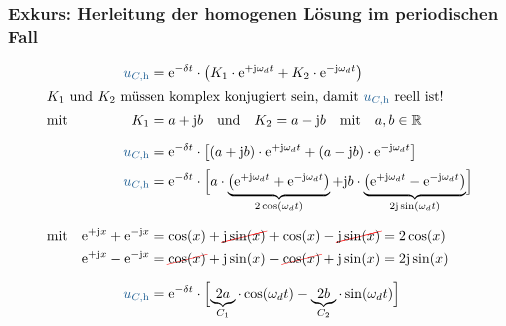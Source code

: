 
\newpage%
\subsubsection{Exkurs: Herleitung der homogenen Lösung im periodischen Fall}
\label{sec:schaltvorgaengezeitbereich:rlc:herleitung}
%
\begin{frame}[t]\ftx{\subsubsecname}
\ifvmode\vspace*{-\baselineskip}\setlength{\parskip}{0ex}\fi%
\begin{align}
    &&
        \ecv{u_{C,\mathrm{h}}} &= \mathrm{e}^{-\delta t} \cdot \left( K_1 \cdot \mathrm{e}^{+\mathrm{j}\omega_d t} + K_2 \cdot \mathrm{e}^{-\mathrm{j}\omega_d t} \right) \nonumber\\
\intertext{$K_1$ und $K_2$ müssen komplex konjugiert sein, damit $\ecv{u_{C,\mathrm{h}}}$ reell ist!}
&\text{mit}&
        K_1 &= a + \mathrm{j} b \mathrlap{\quad\text{und}\quad K_2 = a - \mathrm{j} b\quad\text{mit}\quad a,b \in \mathbb{R}} \nonumber\\[6pt]
    &&
        \ecv{u_{C,\mathrm{h}}} &= \mathrm{e}^{-\delta t} \cdot \left[ (a + \mathrm{j} b) \cdot \mathrm{e}^{+\mathrm{j}\omega_d t} + (a - \mathrm{j} b) \cdot \mathrm{e}^{-\mathrm{j}\omega_d t} \right] \nonumber\\[2pt]
    &&
        \ecv{u_{C,\mathrm{h}}} &= \mathrm{e}^{-\delta t} \cdot
            \left[\vphantom{\Big|}
            \smash{ a \cdot
            \underbrace{\left(
                \mathrm{e}^{+\mathrm{j}\omega_d t} + \mathrm{e}^{-\mathrm{j}\omega_d t}
            \right)}_{2\cos(\omega_d t)}
            + \mathrm{j} b \cdot
            \underbrace{\left(
                \mathrm{e}^{+\mathrm{j}\omega_d t} - \mathrm{e}^{-\mathrm{j}\omega_d t}
            \right)}_{2\mathrm{j}\sin(\omega_d t)}
            }\right] \nonumber\\[20pt]
    &\text{mit}&
        \mathrm{e}^{+\mathrm{j}x} + \mathrm{e}^{-\mathrm{j}x} &= \cos(x) + \redcancel{\mathrm{j}\sin(x)} + \cos(x) - \redcancel{\mathrm{j}\sin(x)} = 2\cos(x) \nonumber\\
    &&
        \mathrm{e}^{+\mathrm{j}x} - \mathrm{e}^{-\mathrm{j}x} &= \redcancel{\cos(x)} + \mathrm{j}\sin(x) - \redcancel{\cos(x)} + \mathrm{j}\sin(x) = 2\mathrm{j}\sin(x) \nonumber\\[6pt]
    &&
        \ecv{u_{C,\mathrm{h}}} &= \mathrm{e}^{-\delta t} \cdot
            \left[\vphantom{\Big|}\smash{
            \underbrace{2a}_{C_1} \cdot \cos(\omega_d t) - \underbrace{2b}_{C_2} \cdot \sin(\omega_d t)
            }\right]
    \label{eq:dgl:rlc:homolsg:periodisch:herleitung}
\end{align}%
\end{frame}%
